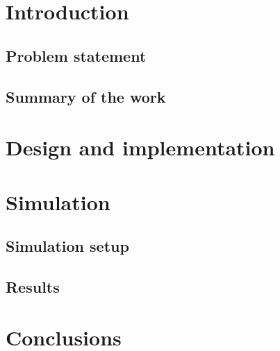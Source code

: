 \section{Introduction}

\subsection{Problem statement}

\subsection{Summary of the work}

\pagebreak

\section{Design and implementation}



\section{Simulation}

\subsection{Simulation setup}

\subsection{Results}



\section{Conclusions}

